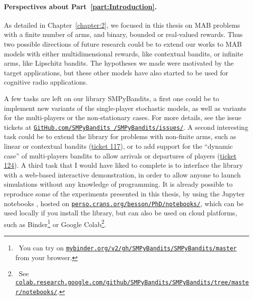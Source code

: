 \paragraph{Perspectives about \textbf{Part~\ref{part:Introduction}}.}



As detailed in Chapter~\ref{chapter:2}, we focused in this thesis on MAB problems with a finite number of arms, and binary, bounded or real-valued rewards.
Thus two possible directions of future research could be to extend our works
to MAB models with either multidimensional rewards, like contextual bandits, or infinite arms, like Lipschitz bandits.
The hypotheses we made were motivated by the target applications, but these other models have also started to be used for cognitive radio applications.



A few tasks are left on our library SMPyBandits, a first one could be to implement new variants of the single-player stochastic models, as well as variants for the multi-players or the non-stationary cases.
For more details, see the issue tickets at \href{https://github.com/SMPyBandits/SMPyBandits/issues/}{\texttt{GitHub.com/SMPyBandits /SMPyBandits/issues/}}.
%
A second interesting task could be to extend the library for problems with non-finite arms, such as linear or contextual bandits (\href{https://github.com/SMPyBandits/SMPyBandits/issues/117}{ticket 117}),
or to add support for the ``dynamic case'' of multi-players bandits to allow arrivals or departures of players (\href{https://github.com/SMPyBandits/SMPyBandits/issues/124}{ticket 124}).
%
A third task that I would have liked to complete is to interface the library with a web-based interactive demonstration, in order to allow anyone to launch simulations without any knowledge of programming.
It is already possible to reproduce some of the experiments presented in this thesis, by using the Jupyter notebooks \cite{jupyter}, hosted on \href{https://perso.crans.org/besson/PhD/notebooks/}{\texttt{perso.crans.org/besson/PhD/notebooks/}}, which can be used locally if you install the library, but can also be used on cloud platforms, such as
Binder\footnote{~You can try on \href{https://mybinder.org/v2/gh/SMPyBandits/SMPyBandits/master}{\texttt{mybinder.org/v2/gh/SMPyBandits/SMPyBandits/master}} from your browser.}
or Google Colab\footnote{~See \href{https://colab.research.google.com/github/SMPyBandits/SMPyBandits/tree/master/notebooks/}{\texttt{colab.research.google.com/github/SMPyBandits/SMPyBandits/tree/master/notebooks/}}.}.



